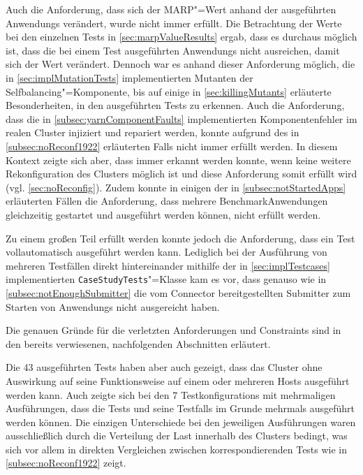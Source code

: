 Auch die Anforderung, dass sich der MARP"=Wert anhand der ausgeführten \glspl{Anwendung} verändert, wurde nicht immer erfüllt.
Die Betrachtung der Werte bei den einzelnen \glspl{Test} in \cref{sec:marpValueResults} ergab, dass es durchaus möglich ist, dass die bei einem \gls{Test} ausgeführten \glspl{Anwendung} nicht ausreichen, damit sich der Wert verändert.
Dennoch war es anhand dieser Anforderung möglich, die in \cref{sec:implMutationTests} implementierten Mutanten der Selfbalancing"=Komponente, bis auf einige in \cref{sec:killingMutants} erläuterte Besonderheiten, in den ausgeführten \glspl{Test} zu erkennen.
Auch die Anforderung, dass die in \cref{subsec:yarnComponentFaults} implementierten Komponentenfehler im realen Cluster injiziert und repariert werden, konnte aufgrund des in \cref{subsec:noReconf1922} erläuterten Falls nicht immer erfüllt werden.
In diesem Kontext zeigte sich aber, dass immer erkannt werden konnte, wenn keine weitere Rekonfiguration des Clusters möglich ist und diese Anforderung somit erfüllt wird (vgl. \cref{sec:noReconfig}).
Zudem konnte in einigen der in \cref{subsec:notStartedApps} erläuterten Fällen die Anforderung, dass mehrere Benchmark\gls{Anwendung}en gleichzeitig gestartet und ausgeführt werden können, nicht erfüllt werden.

Zu einem großen Teil erfüllt werden konnte jedoch die Anforderung, dass ein \gls{Test} vollautomatisch ausgeführt werden kann.
Lediglich bei der Ausführung von mehreren Testfällen direkt hintereinander mithilfe der in \cref{sec:implTestcases} implementierten \texttt{CaseStudyTests}"=Klasse kam es vor, dass genauso wie in \cref{subsec:notEnoughSubmitter} die vom Connector bereitgestellten Submitter zum Starten von \glspl{Anwendung} nicht ausgereicht haben.

Die genauen Gründe für die verletzten Anforderungen und Constraints sind in den bereits verwiesenen, nachfolgenden Abschnitten erläutert.

Die 43 ausgeführten \glspl{Test} haben aber auch gezeigt, dass das Cluster ohne Auswirkung auf seine Funktionsweise auf einem oder mehreren Hosts ausgeführt werden kann.
Auch zeigte sich bei den 7 \glspl{Testkonfiguration} mit mehrmaligen Ausführungen, dass die \glspl{Test} und seine \glspl{Testfall} im Grunde mehrmals ausgeführt werden können.
Die einzigen Unterschiede bei den jeweiligen Ausführungen waren ausschließlich durch die Verteilung der Last innerhalb des Clusters bedingt, was sich vor allem in direkten Vergleichen zwischen korrespondierenden \glspl{Test} wie \zB in \cref{subsec:noReconf1922} zeigt.
